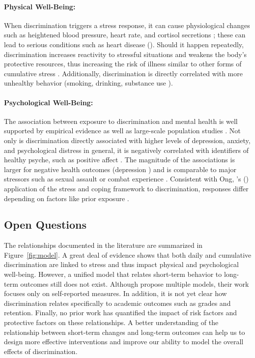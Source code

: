 \paragraph{Physical Well-Being:}
\label{sec:back-discrimination-physical}
When discrimination triggers a stress response, it can cause physiological changes such as heightened blood pressure, heart rate, and cortisol secretions \citep{Brondolo:2008, Steffen:2003, Smart:2010}; these can lead to serious conditions such as heart disease (\eg \cite{Marshall:1997, Cohen:1994}). Should it happen repeatedly, discrimination increases reactivity to stressful situations \citep{GuyllMatthewsBrom-berger:2001} and weakens the body's protective resources, thus increasing the risk of illness similar to other forms of cumulative stress \citep{GeeSpencerChenTakeuchi:2007}. Additionally, discrimination is directly correlated with more unhealthy behavior (\eg smoking, drinking, substance use \citep{LandrineKlonoff:1996, MartinTuchRoman:2003}). 

\paragraph{Psychological Well-Being:}
\label{sec:back-discrimination-mental}
The association between exposure to discrimination and mental health is well supported by empirical evidence \citep{Pascoe:2009} as well as large-scale population studies \citep{Kessler:1999}. Not only is discrimination directly associated with higher levels of depression, anxiety, and psychological distress in general, it is negatively correlated with identifiers of healthy psyche, such as positive affect \citep{Schmitt:2014}. The magnitude of the associations is larger for negative health outcomes (\eg depression \citep{Schmitt:2014}) and is comparable to major stressors such as sexual assault or combat experience \citep{Kessler:1999}. 
Consistent with Ong, \etal's (\citeyear{Ong:2009}) application of the stress and coping framework to discrimination, responses differ depending on factors like prior exposure  \citep{Kessler:1999}. 

\subsection{Open Questions}
\noindent The relationships documented in the literature are summarized in Figure~\ref{fig:model}.  A great deal of evidence shows that both daily and cumulative discrimination are linked to stress and thus impact physical and psychological well-being.  However, a unified model that relates short-term behavior to long-term outcomes still does not exist. Although \citet{Ong:2009} propose multiple models, their work focuses only on self-reported measures. In addition, it is not yet clear how discrimination relates specifically to academic outcomes such as grades and retention. Finally, no prior work has quantified the impact of risk factors and protective factors on these relationships. A better understanding of the relationship between short-term changes and long-term outcomes can help us to design more effective interventions and improve our ability to model the overall effects of discrimination.


